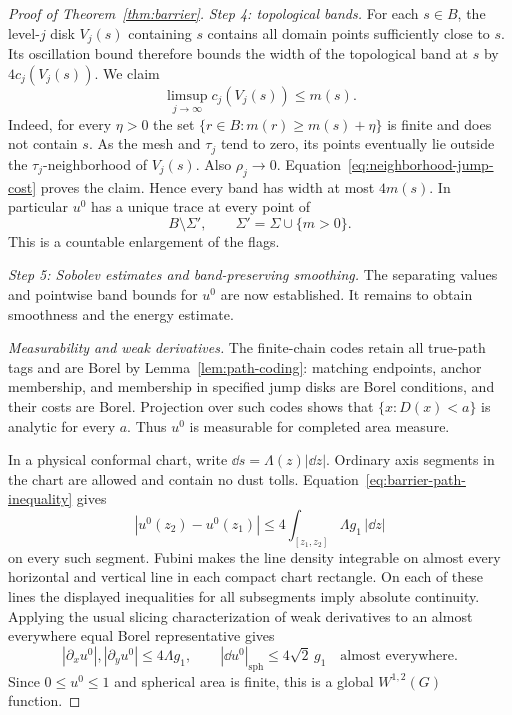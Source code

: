 \begin{proof}[Proof of Theorem~\ref{thm:barrier}]
\emph{Step 4: topological bands.}
For each $s\in B$, the level-$j$ disk $V_j(s)$ containing $s$ contains
all domain points sufficiently close to $s$.  Its oscillation bound
therefore bounds the width of the topological band at $s$ by
$4c_j(V_j(s))$.  We claim
\[
 \limsup_{j\to\infty}c_j(V_j(s))\le m(s).
\]
Indeed, for every $\eta>0$ the set
$\{r\in B:m(r)\ge m(s)+\eta\}$ is finite and does not contain $s$.
As the mesh and $\tau_j$ tend to zero, its points eventually lie
outside the $\tau_j$-neighborhood of $V_j(s)$.  Also $\rho_j\to0$.
Equation~\eqref{eq:neighborhood-jump-cost} proves the claim.
Hence every band has width at most $4m(s)$.  In particular $u^0$
has a unique trace at every point of
\[
 B\setminus\Sigma',\qquad
 \Sigma'=\Sigma\cup\{m>0\}.
\]
This is a countable enlargement of the flags.

\emph{Step 5: Sobolev estimates and band-preserving smoothing.}
The separating values and pointwise band bounds for $u^0$ are now
established.  It remains to obtain smoothness and the energy estimate.

\emph{Measurability and weak derivatives.}
The finite-chain codes retain all true-path tags and are Borel by
Lemma~\ref{lem:path-coding}:
matching endpoints, anchor membership, and membership in specified
jump disks are Borel conditions, and their costs are Borel.
Projection over such codes shows that $\{x:D(x)<a\}$ is analytic
for every $a$.  Thus $u^0$ is measurable for completed area measure.

In a physical conformal chart, write $\dd s=\Lambda(z)|\dd z|$.
Ordinary axis segments in the chart are allowed and contain no dust
tolls.  Equation~\eqref{eq:barrier-path-inequality} gives
\[
 |u^0(z_2)-u^0(z_1)|
   \le4\int_{[z_1,z_2]}\Lambda g_1\,|\dd z|
\]
on every such segment.  Fubini makes the line density integrable
on almost every horizontal and vertical line in each compact chart
rectangle.  On each of these lines the displayed inequalities for
all subsegments imply absolute continuity.  Applying the usual
slicing characterization of weak derivatives to an almost everywhere
equal Borel representative gives
\[
 |\partial_x u^0|,|\partial_y u^0|\le4\Lambda g_1,
 \qquad |\dd u^0|_{\mathrm{sph}}\le4\sqrt2\,g_1
 \quad\text{almost everywhere}.
\]
Since $0\le u^0\le1$ and spherical area is finite, this is a global
$W^{1,2}(G)$ function.


\end{proof}
